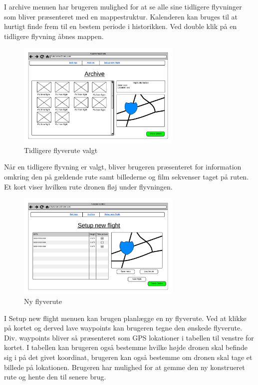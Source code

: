 I archive menuen har brugeren mulighed for at se alle sine tidligere flyvninger som bliver præsenteret med en mappestruktur. Kalenderen kan bruges til at hurtigt finde frem til en bestem periode i historikken. Ved double klik på en tidligere flyvning åbnes mappen.

\vspace{-5pt}
\begin{figure}[H]
	\centering
	\includegraphics[width=0.7\textwidth]{Billeder/UI_mockups/archive_choosen.png}
	\vspace{-5pt}
	\caption{Tidligere flyverute valgt}
	\label{fig:mockup_archive_choosen}
\end{figure}

Når en tidligere flyvning er valgt, bliver brugeren præsenteret for information omkring den på gældende rute samt billederne og film sekvenser taget på ruten. Et kort viser hvilken rute dronen fløj under flyvningen.

\vspace{-5pt}
\begin{figure}[H]
	\centering
	\includegraphics[width=0.7\textwidth]{Billeder/UI_mockups/setup_new_flight.png}
	\vspace{-5pt}
	\caption{Ny flyverute}
	\label{fig:mockup_setup_new_flight}
\end{figure}

I Setup new flight menuen kan brugen planlægge en ny flyverute. Ved at klikke på kortet og derved lave waypoints kan brugeren tegne den ønskede flyverute. Div. waypoints bliver så præsenteret som GPS lokationer i tabellen til venstre for kortet. I tabellen kan brugeren også bestemme hvilke højde dronen skal befinde sig i på det givet koordinat, brugeren kan også bestemme om dronen skal tage et billede på lokationen. Brugeren har mulighed for at gemme den ny konstrueret rute og hente den til senere brug. 